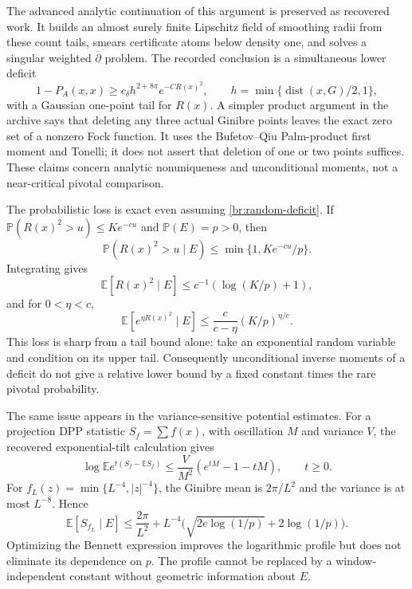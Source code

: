 \documentclass[11pt,a4paper]{article}
\theoremstyle{definition}
\theoremstyle{remark}
\numberwithin{equation}{section}
\begin{document}
The advanced analytic continuation of this argument is preserved as
recovered work.  It builds an almost surely finite Lipschitz field of
smoothing radii from these count tails, smears certificate atoms below
density one, and solves a singular weighted $\overline\partial$ problem.
The recorded conclusion is a simultaneous lower deficit
\begin{equation}
 1-P_A(x,x)\geq c_\delta h^{2+8\pi}e^{-C R(x)^2},
 \qquad h=\min\{\operatorname{dist}(x,G)/2,1\},
 \label{br:random-deficit}
\end{equation}
with a Gaussian one-point tail for $R(x)$.  A simpler product argument
in the archive says that deleting any three actual Ginibre points
leaves the exact zero set of a nonzero Fock function.  It uses the
Bufetov--Qiu Palm-product first moment and Tonelli; it does not assert
that deletion of one or two points suffices.  These claims concern
analytic nonuniqueness and unconditional moments, not a near-critical
pivotal comparison.

The probabilistic loss is exact even assuming
\eqref{br:random-deficit}.  If
$\mathbb P(R(x)^2>u)\leq Ke^{-cu}$ and $\mathbb P(E)=p>0$, then
\[
 \mathbb P(R(x)^2>u\mid E)
 \leq\min\{1,Ke^{-cu}/p\}.
\]
Integrating gives
\[
 \mathbb E[R(x)^2\mid E]\leq c^{-1}(\log(K/p)+1),
\]
and for $0<\eta<c$,
\[
 \mathbb E[e^{\eta R(x)^2}\mid E]
 \leq\frac c{c-\eta}(K/p)^{\eta/c}.
\]
This loss is sharp from a tail bound alone: take an exponential random
variable and condition on its upper tail.  Consequently unconditional
inverse moments of a deficit do not give a relative lower bound by
a fixed constant times the rare pivotal probability.

The same issue appears in the variance-sensitive potential estimates.
For a projection DPP statistic $S_f=\sum f(x)$, with oscillation $M$
and variance $V$, the recovered exponential-tilt calculation gives
\[
 \log\mathbb E e^{t(S_f-\mathbb ES_f)}
 \leq\frac V{M^2}(e^{tM}-1-tM),\qquad t\geq0.
\]
For $f_L(z)=\min\{L^{-4},|z|^{-4}\}$, the Ginibre mean is
$2\pi/L^2$ and the variance is at most $L^{-8}$.  Hence
\[
 \mathbb E[S_{f_L}\mid E]
 \leq\frac{2\pi}{L^2}
  +L^{-4}\bigl(\sqrt{2e\log(1/p)}+2\log(1/p)\bigr).
\]
Optimizing the Bennett expression improves the logarithmic profile
but does not eliminate its dependence on $p$.  The profile cannot
be replaced by a window-independent constant without geometric
information about $E$.
\end{document}
